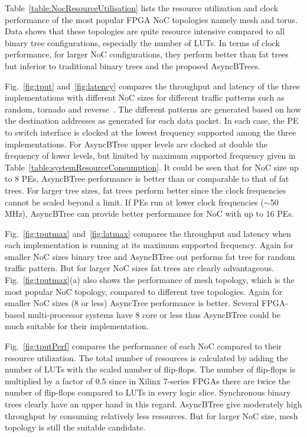 
Table~\ref{table:NocResourceUtilisation} lists the resource utilization and clock performance of the most popular FPGA NoC topologies namely mesh and torus.
Data shows that these topologies are quite resource intensive compared to all binary tree configurations, especially the number of LUTs.
In terms of clock performance, for larger NoC configurations, they perform better than fat trees but inferior to traditional binary trees and the proposed AsyncBTrees.

Fig.~\ref{fig:tput} and~\ref{fig:latency} compares the throughput and latency of the three implementations with different NoC sizes for different traffic patterns such as random, tornado and reverse~\cite{Bahn2008}.
The different patterns are generated based on how the destination addresses as generated for each data packet.
In each case, the PE to switch interface is clocked at the lowest frequency supported among the three implementations.
For AsyncBTree upper levels are clocked at double the frequency of lower levels, but limited by maximum supported frequency given in Table~\ref{table:systemResourceConsumption}.
It could be seen that for NoC size up to 8 PEs, AsyncBTree performance is better than or comparable to that of fat trees.
For larger tree sizes, fat trees perform better since the clock frequencies cannot be scaled beyond a limit.
If PEs run at lower clock frequencies ($\sim$50 MHz), AsyncBTree can provide better performance for NoC with up to 16 PEs. 

Fig.~\ref{fig:tputmax} and~\ref{fig:latmax} compares the throughput and latency when each implementation is running at its maximum supported frequency.
Again for smaller NoC sizes binary tree and AsyncBTree out performs fat tree for random traffic pattern.
But for larger NoC sizes fat trees are clearly advantageous.
Fig.~\ref{fig:tputmax}(a) also shows the performance of mesh topology, which is the most popular NoC topology, compared to different tree topologies.
Again for smaller NoC sizes (8 or less) AsyncTree performance is better.
Several FPGA-based multi-processor systems have 8 core or less thus AsyncBTree could be much suitable for their implementation.

Fig.~\ref{fig:tputPerf} compares the performance of each NoC compared to their resource utilization.
The total number of resources is calculated by adding the number of LUTs with the scaled number of flip-flops.
The number of flip-flops is multiplied by a factor of 0.5 since in Xilinx 7-series FPGAs there are twice the number of flip-flops compared to LUTs in every logic slice.
Synchronous binary trees clearly have an upper hand in this regard.
AsyncBTree give moderately high throughput by consuming relatively less resources.
But for larger NoC size, mesh topology is still the suitable candidate.


